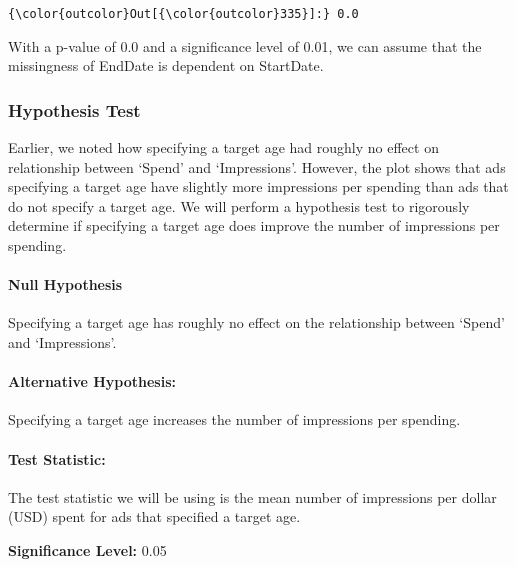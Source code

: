 \documentclass[11pt]{article}
\begin{document}
\begin{Verbatim}[commandchars=\\\{\}]
{\color{outcolor}Out[{\color{outcolor}335}]:} 0.0
\end{Verbatim}
            
    With a p-value of 0.0 and a significance level of 0.01, we can assume
that the missingness of EndDate is dependent on StartDate.

    \hypertarget{hypothesis-test}{%
\subsubsection{Hypothesis Test}\label{hypothesis-test}}

    Earlier, we noted how specifying a target age had roughly no effect on
relationship between `Spend' and `Impressions'. However, the plot shows
that ads specifying a target age have slightly more impressions per
spending than ads that do not specify a target age. We will perform a
hypothesis test to rigorously determine if specifying a target age does
improve the number of impressions per spending.

\hypertarget{null-hypothesis}{%
\paragraph{Null Hypothesis}\label{null-hypothesis}}

Specifying a target age has roughly no effect on the relationship
between `Spend' and `Impressions'.

\hypertarget{alternative-hypothesis}{%
\paragraph{Alternative Hypothesis:}\label{alternative-hypothesis}}

Specifying a target age increases the number of impressions per
spending.

\hypertarget{test-statistic}{%
\paragraph{Test Statistic:}\label{test-statistic}}

The test statistic we will be using is the mean number of impressions
per dollar (USD) spent for ads that specified a target age.

\textbf{Significance Level:} 0.05
\end{document}
